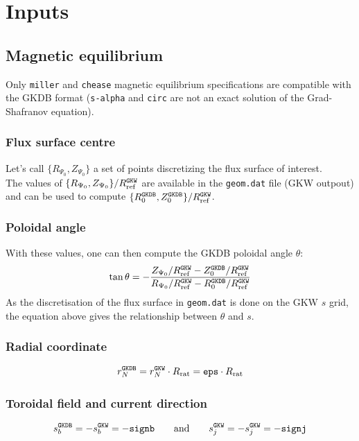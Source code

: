 \documentclass[a4paper]{report}
\begin{document}
\chapter{Inputs}
\section{Magnetic equilibrium} \label{sec:magequil}
Only \texttt{miller} and \texttt{chease} magnetic equilibrium specifications are compatible with the GKDB format (\texttt{s-alpha} and \texttt{circ} are not an exact solution of the Grad-Shafranov equation).
\subsection{Flux surface centre}
Let's call $\{R_{\Psi_0},Z_{\Psi_0}\}$ a set of points discretizing the flux surface of interest.\\
The values of $\{R_{\Psi_0},Z_{\Psi_0}\}/R_{\textrm{ref}}^{\texttt{GKW}}$ are available in the \texttt{geom.dat} file (GKW outpout) and can be used to compute $\{R_0^{\texttt{GKDB}},Z_0^{\texttt{GKDB}}\}/R_{\textrm{ref}}^{\texttt{GKW}}$. 

\subsection{Poloidal angle}
With these values, one can then compute the GKDB poloidal angle $\theta$:
\begin{equation}
 \tan \theta = - \frac{Z_{\Psi_0}/R_{\textrm{ref}}^{\texttt{GKW}}-Z_0^{\texttt{GKDB}}/R_{\textrm{ref}}^{\texttt{GKW}}}{R_{\Psi_0}/R_{\textrm{ref}}^{\texttt{GKW}}-R_0^{\texttt{GKDB}}/R_{\textrm{ref}}^{\texttt{GKW}}}
\end{equation}
As the discretisation of the flux surface in \texttt{geom.dat} is done on the GKW $s$ grid, the equation above gives the relationship between $\theta$ and $s$.

\subsection{Radial coordinate}
\begin{equation}
r_N^{\texttt{GKDB}} = r_N^{\texttt{GKW}} \cdot R_\textrm{rat}= \texttt{eps}\cdot R_\textrm{rat}
\end{equation}

\subsection{Toroidal field and current direction}
\begin{equation}
 s_b^{\texttt{GKDB}} = - s_b^{\texttt{GKW}}=-\texttt{signb} \qquad \textrm{and} \qquad s_j^{\texttt{GKW}}=-s_j^{\texttt{GKW}}=-\texttt{signj}
\end{equation}
\end{document}
